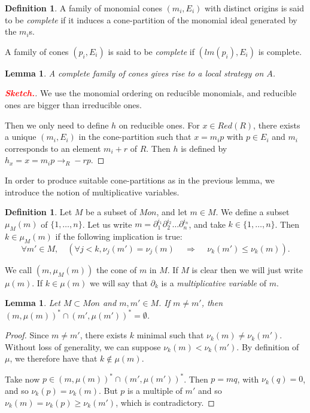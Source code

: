 \documentclass[10pt]{easychair}
\newtheorem{lemma}[theorem]{Lemma}
\theoremstyle{definition}
\newtheorem{definition}[theorem]{Definition}
\newcommand\todo[1]{{\bf\textcolor{red}{#1.}}}
\newcommand\rewR{\to_R}
\begin{document}
 \begin{definition}
   A family of monomial cones $(m_i,E_i)$ with distinct origins is said to be \emph{complete} if it induces a cone-partition of the monomial ideal generated by the $m_i$s. 

   A family of cones $(p_i,E_i)$ is said to be \emph{complete} if $(lm(p_i),E_i)$ is complete. 
 \end{definition}

 \begin{lemma}
  A complete family of cones gives rise to a local strategy on $A$. 
\end{lemma}
\begin{proof}[\todo{Sketch}]
  We use the monomial ordering on reducible monomials, and reducible ones are bigger than irreducible ones.

  Then we only need to define $h$ on reducible ones. For $x \in Red(R)$, there exists a unique $(m_i,E_i)$ in the cone-partition such that $x=m_i p$ with $p \in E_i$ and $m_i$ corresponds to an element $m_i + r$ of $R$. Then $h$ is defined by $h_x = x = m_ip  \rewR -rp$.
\end{proof}


In order to produce suitable cone-partitions as in the previous lemma, we introduce the notion of multiplicative variables.

\begin{definition}
  Let $M$ be a subset of $Mon$, and let $m  \in M$. We define a subset $\mu_M(m)$ of $\{1,\ldots,n\}$. Let us write $m = \partial_1^{i_1}\partial_2^{i_2}\ldots \partial_n^{i_n}$, and take $k \in \{1,\ldots,n\}$. Then $k \in \mu_M(m)$ if the following implication is true:
  \[
\forall m' \in M, \quad (\forall j < k, \nu_j(m') = \nu_j(m) \, \quad \Rightarrow \quad \, \nu_k(m') \leq \nu_k(m)).
  \]
  

  We call $(m,\mu_M(m))$ the cone of $m$ in $M$. If $M$ is clear then we will just write $\mu(m)$. If $k \in \mu(m)$ we will say that $\partial_k$ is a \emph{multiplicative variable} of $m$.
\end{definition}

\begin{lemma}\label{lem:multiplicative_cones_disjoint}
Let $M \subset Mon$ and $m,m' \in M$. If $m \neq m'$, then $(m,\mu(m))^* \cap (m',\mu(m'))^* = \emptyset$.
\end{lemma}
\begin{proof}
   Since $m \neq m'$, there exists $k$ minimal such that $\nu_k(m) \neq \nu_k(m')$. Without loss of generality, we can suppose $\nu_k(m) < \nu_k(m')$. By definition of $\mu$, we therefore have that $k \notin \mu(m)$.

   Take now $p \in (m,\mu(m))^* \cap (m',\mu(m'))^*$. Then $p = mq$, with $\nu_k(q) = 0$, and so $\nu_k(p) = \nu_k(m)$. But $p$ is a multiple of $m'$ and so $\nu_k(m) = \nu_k(p) \geq \nu_k(m')$, which is contradictory.
 \end{proof}
\end{document}
